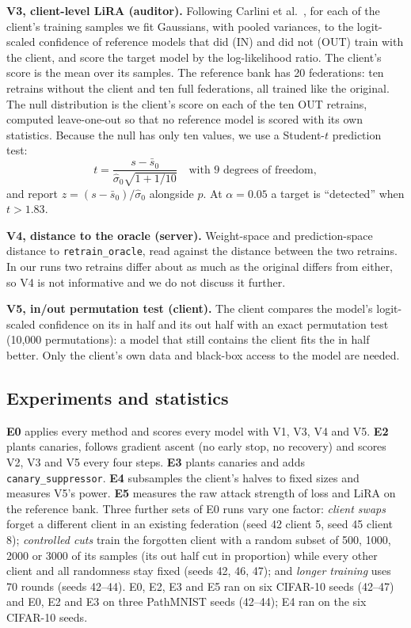 \documentclass[11pt]{article}
\newcommand{\m}[1]{\texttt{#1}}
\newcommand{\ro}{\m{retrain\_oracle}}
\newcommand{\cs}{\m{canary\_suppressor}}
\begin{document}
\textbf{V3, client-level LiRA (auditor).} Following Carlini et
al.~\cite{carlini2022}, for each of the client's training samples we fit
Gaussians, with pooled variances, to the logit-scaled confidence of reference
models that did (IN) and did not (OUT) train with the client, and score the
target model by the log-likelihood ratio. The client's score is the mean over
its samples. The reference bank has 20 federations: ten retrains without the
client and ten full federations, all trained like the original. The null
distribution is the client's score on each of the ten OUT retrains, computed
leave-one-out so that no reference model is scored with its own statistics.
Because the null has only ten values, we use a Student-$t$ prediction test:
\[
t=\frac{s-\bar s_0}{\hat\sigma_0\sqrt{1+1/10}}\quad\text{with 9 degrees of freedom},
\]
and report $z=(s-\bar s_0)/\hat\sigma_0$ alongside $p$. At $\alpha=0.05$ a
target is ``detected'' when $t>1.83$.

\textbf{V4, distance to the oracle (server).} Weight-space and prediction-space
distance to \ro, read against the distance between the two retrains. In our
runs two retrains differ about as much as the original differs from either, so
V4 is not informative and we do not discuss it further.

\textbf{V5, in/out permutation test (client).} The client compares the model's
logit-scaled confidence on its in half and its out half with an exact
permutation test (10{,}000 permutations): a model that still contains the
client fits the in half better. Only the client's own data and black-box access
to the model are needed.

\subsection{Experiments and statistics}

\textbf{E0} applies every method and scores every model with V1, V3, V4 and V5.
\textbf{E2} plants canaries, follows gradient ascent (no early stop, no
recovery) and scores V2, V3 and V5 every four steps. \textbf{E3} plants
canaries and adds \cs. \textbf{E4} subsamples the client's halves to fixed
sizes and measures V5's power. \textbf{E5} measures the raw attack strength of
loss and LiRA on the reference bank. Three further sets of E0 runs vary one
factor: \emph{client swaps} forget a different client in an existing federation
(seed 42 client 5, seed 45 client 8); \emph{controlled cuts} train the forgotten
client with a random subset of 500, 1000, 2000 or 3000 of its samples (its out
half cut in proportion) while every other client and all randomness stay
fixed (seeds 42, 46, 47); and \emph{longer training} uses 70 rounds (seeds
42--44). E0, E2, E3 and E5 ran on six CIFAR-10 seeds (42--47) and E0, E2 and E3
on three PathMNIST seeds (42--44); E4 ran on the six CIFAR-10 seeds.
\end{document}
